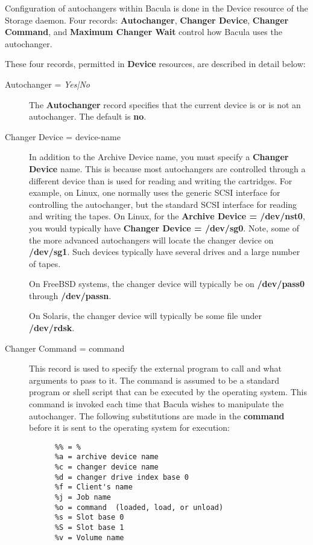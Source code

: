 Configuration of autochangers within Bacula is done in the Device resource of
the Storage daemon. Four records: {\bf Autochanger}, {\bf Changer Device},
{\bf Changer Command}, and {\bf Maximum Changer Wait} control how Bacula uses
the autochanger. 

These four records, permitted in {\bf Device} resources, are described in
detail below: 

\begin{description}

\item [Autochanger = {\it Yes|No} ]
   The {\bf Autochanger} record specifies that the current device  is or is not
an autochanger. The default is {\bf no}.  

\item [Changer Device = \lt{}device-name\gt{}]
   In addition to the Archive Device name, you must specify a  {\bf Changer
Device} name. This is because most autochangers are  controlled through a
different device than is used for reading and  writing the cartridges. For
example, on Linux, one normally uses the generic SCSI interface for
controlling the autochanger, but the standard SCSI interface for reading and
writing the  tapes. On Linux, for the {\bf Archive Device = /dev/nst0},  you
would typically have {\bf Changer Device = /dev/sg0}.  Note, some of the more
advanced autochangers will locate the changer device on {\bf /dev/sg1}. Such
devices typically have  several drives and a large number of tapes.  

On FreeBSD systems, the changer device will typically be on {\bf /dev/pass0}
through {\bf /dev/passn}.  

On Solaris, the changer device will typically be some file  under {\bf
/dev/rdsk}.  

\item [Changer Command = \lt{}command\gt{}]
   This record is used to specify the external program to call  and what
arguments to pass to it. The command is assumed to be  a standard program or
shell script that can be executed by  the operating system. This command is
invoked each time that Bacula wishes to manipulate the autochanger.  The
following substitutions are made in the {\bf command}  before it is sent to
the operating system for execution:  

\footnotesize
\begin{verbatim}
      %% = %
      %a = archive device name
      %c = changer device name
      %d = changer drive index base 0
      %f = Client's name
      %j = Job name
      %o = command  (loaded, load, or unload)
      %s = Slot base 0
      %S = Slot base 1
      %v = Volume name
     

\end{verbatim}
\end{description}
